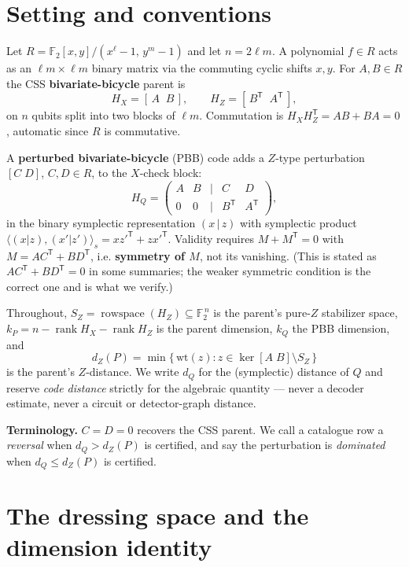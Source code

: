 \documentclass[11pt]{article}
\theoremstyle{plain}
\theoremstyle{remark}
\begin{document}
\section{Setting and conventions}\label{sec:conventions}

Let $R=\mathbb{F}_2[x,y]/(x^{\ell}-1,\,y^{m}-1)$ and let $n=2\ell m$. A polynomial
$f\in R$ acts as an $\ell m\times \ell m$ binary matrix via the commuting cyclic shifts
$x,y$. For $A,B\in R$ the CSS \textbf{bivariate-bicycle} parent is
\[
H_X=[\,A\;\;B\,],\qquad H_Z=[\,B^{\mathsf T}\;\;A^{\mathsf T}\,],
\]
on $n$ qubits split into two blocks of $\ell m$. Commutation is
$H_XH_Z^{\mathsf T}=AB+BA=0$, automatic since $R$ is commutative.

A \textbf{perturbed bivariate-bicycle} (PBB) code adds a $Z$-type perturbation $[C\;D]$,
$C,D\in R$, to the $X$-check block:
\[
H_Q=\begin{pmatrix} A & B & \big| & C & D\\[2pt] 0 & 0 & \big| & B^{\mathsf T} & A^{\mathsf T}\end{pmatrix},
\]
in the binary symplectic representation $(x\,|\,z)$ with symplectic product
$\langle (x|z),(x'|z')\rangle_s = xz'^{\mathsf T}+zx'^{\mathsf T}$. Validity requires
$M+M^{\mathsf T}=0$ with $M=AC^{\mathsf T}+BD^{\mathsf T}$, i.e. \textbf{symmetry of $M$}, not
its vanishing. (This is stated as $AC^{\mathsf T}+BD^{\mathsf T}=0$ in some summaries; the
weaker symmetric condition is the correct one and is what we verify.)

Throughout, $S_Z=\operatorname{rowspace}(H_Z)\subseteq\mathbb{F}_2^{\,n}$ is the parent's
pure-$Z$ stabilizer space, $k_P=n-\operatorname{rank}H_X-\operatorname{rank}H_Z$ is the
parent dimension, $k_Q$ the PBB dimension, and
\[
d_Z(P)=\min\{\,\mathrm{wt}(z) : z\in\ker[A\;B]\setminus S_Z\,\}
\]
is the parent's $Z$-distance. We write $d_Q$ for the (symplectic) distance of $Q$ and
reserve \emph{code distance} strictly for the algebraic quantity --- never a decoder estimate,
never a circuit or detector-graph distance.

\textbf{Terminology.} $C=D=0$ recovers the CSS parent. We call a catalogue row a \emph{reversal}
when $d_Q > d_Z(P)$ is certified, and say the perturbation is \emph{dominated} when
$d_Q \le d_Z(P)$ is certified.

\section{The dressing space and the dimension identity}\label{sec:dressing}
\end{document}
